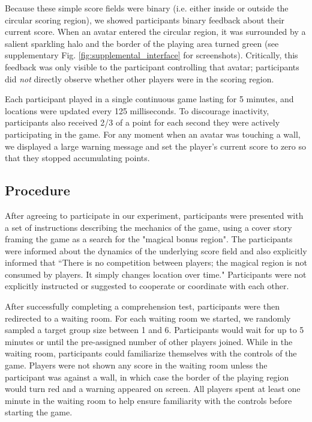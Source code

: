 \documentclass[12pt,letterpaper]{article}
\begin{document}
Because these simple score fields were binary (i.e. either inside or outside the circular scoring region), we showed participants binary feedback about their current score.
When an avatar entered the circular region, it was surrounded by a salient sparkling halo and the border of the playing area turned green (see supplementary Fig. \ref{fig:supplemental_interface} for screenshots). 
Critically, this feedback was only visible to the participant controlling that avatar; participants did \emph{not} directly observe whether other players were in the scoring region.

Each participant played in a single
continuous game lasting for 5 minutes, and locations were updated every 125 milliseconds. 
To discourage inactivity, participants also received 2/3 of a point for each second they were actively participating in the game.
For any moment when an avatar was touching a wall, we displayed a large warning message and set the player's current score to zero so that they stopped accumulating points.

\subsection{Procedure}

After agreeing to participate in our experiment, participants were presented with a set of instructions describing the mechanics of the game, using a cover story framing the game as a search for the "magical bonus region".  
The participants were informed about the dynamics of the underlying score field and also explicitly informed that ``There is no competition between players; the magical region is not consumed by players. It simply changes location over time." 
Participants were not explicitly instructed or suggested to cooperate or coordinate with each other.

After successfully completing a comprehension test, participants were then redirected to a waiting room.
For each waiting room we started, we randomly sampled a target group size between 1 and 6.
Participants would wait for up to 5 minutes or until the pre-assigned number of other players joined.
While in the waiting room, participants could familiarize themselves with the controls of the game.  Players were not shown any score in
the waiting room unless the participant was against a wall, in which
case the border of the playing region would turn red and a warning appeared on screen.  All players spent at least one minute in the waiting room to help ensure familiarity with the controls before starting the game. 
\end{document}
